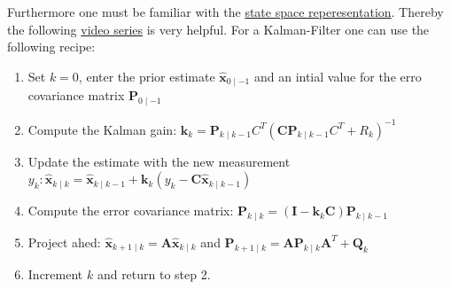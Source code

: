Furthermore one must be familiar with the \href{https://en.wikipedia.org/wiki/State-space_representation}{state space reperesentation}. Thereby the following \href{https://youtu.be/-cD7WkbAIL0}{video series} is very helpful.
For a Kalman-Filter one can use the following recipe:
\begin{enumerate}
  \item Set $k=0$, enter the prior estimate $\hat{\boldsymbol{x}}_{0 \mid-1}$ and an intial value for the erro covariance matrix $\boldsymbol{P}_{0 \mid-1}$
  \item Compute the Kalman gain: $\boldsymbol{k}_k=\boldsymbol{P}_{k \mid k-1} C^T\left(\boldsymbol{C} \boldsymbol{P}_{k \mid k-1} C^T+R_k\right)^{-1}$
  \item Update the estimate with the new measurement $y_k: \hat{\boldsymbol{x}}_{k \mid k}=\hat{\boldsymbol{x}}_{k \mid k-1}+\boldsymbol{k}_k\left(y_k-\boldsymbol{C} \hat{\boldsymbol{x}}_{k \mid k-1}\right)$
  \item Compute the error covariance matrix: $\boldsymbol{P}_{k \mid k}=\left(\boldsymbol{I}-\boldsymbol{k}_k \boldsymbol{C}\right) \boldsymbol{P}_{k \mid k-1}$
  \item Project ahed: $\hat{\boldsymbol{x}}_{k+1 \mid k}=\boldsymbol{A} \hat{\boldsymbol{x}}_{k \mid k}$ and $\boldsymbol{P}_{k+1 \mid k}=\boldsymbol{A} \boldsymbol{P}_{k \mid k} \boldsymbol{A}^T+\boldsymbol{Q}_k$
  \item Increment $k$ and return to step 2.
\end{enumerate}

